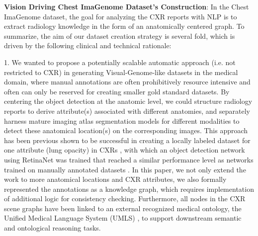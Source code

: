 
\textbf{Vision Driving Chest ImaGenome Dataset's Construction}: In the Chest ImaGenome dataset, the goal for analyzing the CXR reports with NLP is to extract radiology knowledge in the form of an anatomically centered graph. To summarize, the aim of our dataset creation strategy is several fold, which is driven by the following clinical and technical rationale:

1. We wanted to propose a potentially scalable automatic approach (i.e. not restricted to CXR) in generating Visual-Genome-like datasets in the medical domain, where manual annotations are often prohibitively resource intensive and often can only be reserved for creating smaller gold standard datasets. By centering the object detection at the anatomic level, we could structure radiology reports to derive attribute(s) associated with different anatomies, and separately harness mature imaging atlas segmentation models for different modalities to detect these anatomical location(s) on the corresponding images. This approach has been previous shown to be successful in creating a locally labeled dataset for one attribute (lung opacity) in CXRs \cite{}, with which an object detection network using RetinaNet was trained that reached a similar performance level as networks trained on manually annotated datasets \cite{}. In this paper, we not only extend the work to more anatomical locations and CXR attributes, we also formally represented the annotations as a knowledge graph, which requires implementation of additional logic for consistency checking. Furthermore, all nodes in the CXR scene graphs have been linked to an external recognized medical ontology, the Unified Medical Language System (UMLS) \cite{}, to support downstream semantic and ontological reasoning tasks.


